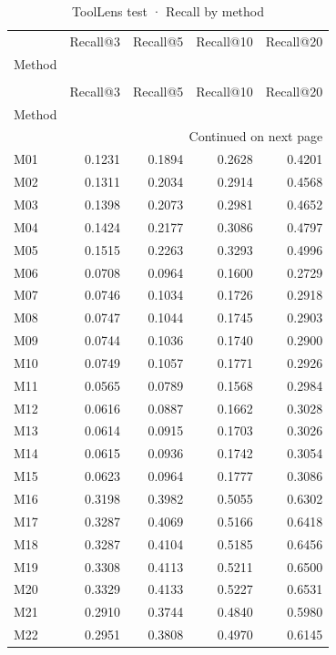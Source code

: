 \begin{longtable}{lrrrr}
\caption{ToolLens test · Recall by method} \label{tab:ToolLens-test-family-family-recall} \\
\toprule
 & Recall@3 & Recall@5 & Recall@10 & Recall@20 \\
Method &  &  &  &  \\
\midrule
\endfirsthead
\caption[]{ToolLens test · Recall by method} \\
\toprule
 & Recall@3 & Recall@5 & Recall@10 & Recall@20 \\
Method &  &  &  &  \\
\midrule
\endhead
\midrule
\multicolumn{5}{r}{Continued on next page} \\
\midrule
\endfoot
\bottomrule
\endlastfoot
M01 & 0.1231 & 0.1894 & 0.2628 & 0.4201 \\
M02 & 0.1311 & 0.2034 & 0.2914 & 0.4568 \\
M03 & 0.1398 & 0.2073 & 0.2981 & 0.4652 \\
M04 & 0.1424 & 0.2177 & 0.3086 & 0.4797 \\
M05 & 0.1515 & 0.2263 & 0.3293 & 0.4996 \\
M06 & 0.0708 & 0.0964 & 0.1600 & 0.2729 \\
M07 & 0.0746 & 0.1034 & 0.1726 & 0.2918 \\
M08 & 0.0747 & 0.1044 & 0.1745 & 0.2903 \\
M09 & 0.0744 & 0.1036 & 0.1740 & 0.2900 \\
M10 & 0.0749 & 0.1057 & 0.1771 & 0.2926 \\
M11 & 0.0565 & 0.0789 & 0.1568 & 0.2984 \\
M12 & 0.0616 & 0.0887 & 0.1662 & 0.3028 \\
M13 & 0.0614 & 0.0915 & 0.1703 & 0.3026 \\
M14 & 0.0615 & 0.0936 & 0.1742 & 0.3054 \\
M15 & 0.0623 & 0.0964 & 0.1777 & 0.3086 \\
M16 & 0.3198 & 0.3982 & 0.5055 & 0.6302 \\
M17 & 0.3287 & 0.4069 & 0.5166 & 0.6418 \\
M18 & 0.3287 & 0.4104 & 0.5185 & 0.6456 \\
M19 & 0.3308 & 0.4113 & 0.5211 & 0.6500 \\
M20 & 0.3329 & 0.4133 & 0.5227 & 0.6531 \\
M21 & 0.2910 & 0.3744 & 0.4840 & 0.5980 \\
M22 & 0.2951 & 0.3808 & 0.4970 & 0.6145 \\

\end{longtable}
